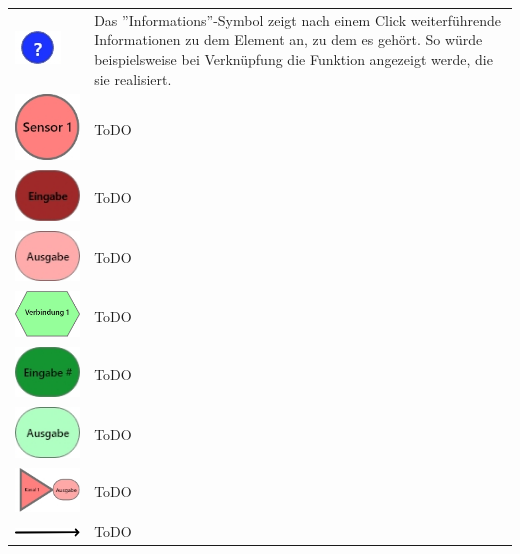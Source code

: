 \documentclass[parskip=full]{scrartcl}
\begin{document}
\begin{tabular}[t]{p{1cm} p{10cm}}
	\vspace{0cm}\includegraphics[width = 1 cm]{Grafik/Information.jpg} & Das ''Informations''-Symbol zeigt nach einem Click weiterführende Informationen zu dem Element an, zu dem es gehört. So würde beispielsweise bei Verknüpfung die Funktion angezeigt werde, die sie realisiert.\newline\\
	\vspace{0cm}\includegraphics[width = 1 cm]{Grafik/Sensorelement.jpg} & ToDO\\
	\vspace{0cm}\includegraphics[width = 1 cm]{Grafik/Eingabe-Sensor.jpg} & ToDO\\
	\vspace{0cm}\includegraphics[width = 1 cm]{Grafik/Ausgabe-Sensor.jpg} & ToDO\\
	\vspace{0cm}\includegraphics[width = 1 cm]{Grafik/Verbindungselement.jpg} & ToDO\\
	\vspace{0cm}\includegraphics[width = 1 cm]{Grafik/Eingabe-Verbindung.jpg} & ToDO\\
	\vspace{0cm}\includegraphics[width = 1 cm]{Grafik/Ausgabe-Verbindung.jpg} & ToDO\\
	\vspace{0cm}\includegraphics[width = 1 cm]{Grafik/Kanal.jpg} & ToDO\\
	\vspace{0cm}\includegraphics[width = 1 cm]{Grafik/Verbindungspfeil.jpg} & ToDO\\
\end{tabular}
\end{document}
